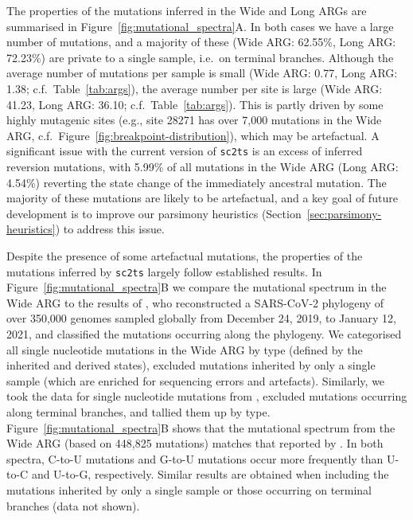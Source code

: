 \documentclass{article}
\begin{document}
The properties of the mutations inferred in the Wide and Long
ARGs are summarised in Figure~\ref{fig:mutational_spectra}A. In both
cases we have a large number of mutations, and a majority of these
(Wide ARG: 62.55\%, Long ARG: 72.23\%) are private to a single
sample, i.e.\ on terminal branches.
Although the average number
of mutations per sample is small
(Wide ARG: 0.77, Long ARG: 1.38; c.f.\ Table~\ref{tab:args}), the average number per site
is large (Wide ARG: 41.23, Long ARG: 36.10; c.f.\ Table~\ref{tab:args}). This is
partly driven by some highly mutagenic sites (e.g., site 28271 has over 7,000
mutations in the Wide ARG, c.f.\ Figure~\ref{fig:breakpoint-distribution}), which
may be artefactual.
A significant issue with the current version of \texttt{sc2ts} is an excess
of inferred reversion mutations, with 5.99\% of all mutations in the Wide
ARG (Long ARG: 4.54\%) reverting the state change of the immediately
ancestral mutation. The majority of these mutations are likely to be
artefactual, and a key goal of future development is to improve
our parsimony heuristics (Section~\ref{sec:parsimony-heuristics}) to
address this issue.

Despite the presence of some artefactual mutations,
the properties of the mutations inferred by \texttt{sc2ts} largely follow
established results.
In Figure~\ref{fig:mutational_spectra}B we compare the mutational spectrum
in the Wide ARG to the results of \cite{Yi2021-sc},
who reconstructed a SARS-CoV-2 phylogeny of
over 350,000 genomes sampled globally from December 24, 2019, to January 12,
2021, and classified the mutations occurring along the phylogeny.
We categorised all single nucleotide
mutations in the Wide ARG by type (defined by the inherited and derived states),
excluded mutations inherited by only a single sample (which are
enriched for sequencing errors and artefacts).
Similarly, we took the data for single nucleotide mutations from
\citep[][\url{https://github.com/ju-lab/SC2_evol_signature}]{Yi2021-sc}, excluded
mutations occurring along terminal branches, and tallied them up by type.
Figure~\ref{fig:mutational_spectra}B shows that the mutational spectrum from the
Wide ARG (based on 448,825 mutations) matches that reported by \citet[based on
92,344 mutations]{Yi2021-sc}. In both spectra, C-to-U mutations and G-to-U
mutations occur more frequently than U-to-C and U-to-G, respectively. Similar
results are obtained when including the mutations inherited by only a single
sample or those occurring on terminal branches (data not shown).
\end{document}
